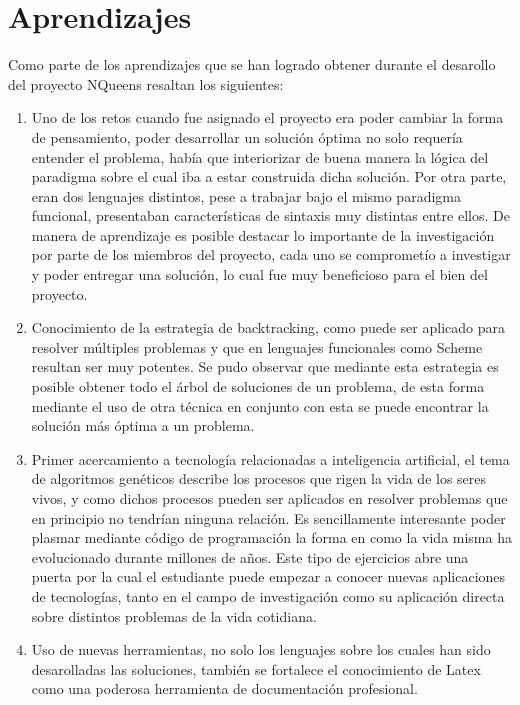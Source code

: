 \documentclass[12pt,a4paper]{article}
\begin{document}
\section{Aprendizajes}
\bigskip
	Como parte de los aprendizajes que se han logrado obtener durante el desarollo del proyecto NQueens resaltan los  siguientes:
	\begin{enumerate}
		\item Uno de los retos cuando fue asignado el proyecto era poder cambiar la forma de pensamiento, poder desarrollar un solución óptima no solo requería entender el problema, había que interiorizar de buena manera la lógica del paradigma sobre el cual iba a estar construida dicha solución. Por otra parte, eran dos lenguajes distintos, pese a trabajar bajo el mismo paradigma funcional, presentaban características de sintaxis muy distintas entre ellos. De manera de aprendizaje es posible destacar lo importante de la investigación por parte de los miembros del proyecto, cada uno se comprometío a investigar y poder entregar una solución, lo cual fue muy beneficioso para el bien del proyecto.
	\item Conocimiento de la estrategia de backtracking, como puede ser aplicado para resolver múltiples problemas y que en lenguajes funcionales como Scheme resultan ser muy potentes. Se pudo observar que mediante esta estrategia es posible obtener  todo el árbol de soluciones de un problema, de esta forma mediante el uso de otra técnica en conjunto con esta se puede encontrar la solución más óptima a un problema.
	\item Primer acercamiento a tecnología relacionadas a inteligencia artificial, el tema de algoritmos genéticos describe los procesos que rigen la vida de los seres vivos, y como dichos procesos pueden ser aplicados en resolver problemas que en principio no tendrían ninguna relación. Es sencillamente interesante poder plasmar mediante código de programación la forma en como la vida misma ha evolucionado durante millones de años. Este tipo de ejercicios abre una puerta por la cual el estudiante puede empezar a conocer nuevas aplicaciones de tecnologías, tanto en el campo de investigación como su aplicación directa sobre distintos problemas de la vida cotidiana.
	 \item Uso de nuevas herramientas, no solo los lenguajes sobre los cuales han sido desarolladas las soluciones, también se fortalece el conocimiento de Latex como una poderosa herramienta de documentación profesional.
	\end{enumerate}
\newpage
\end{document}
